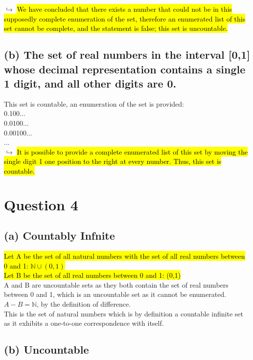 \documentclass[a4paper, 12pt]{article}
\begin{document}
$\hookrightarrow$ \hl{We have concluded that there exists a number that could not be in this supposedly complete enumeration of the set, therefore an enumerated list of this set cannot be complete, and the statement is false; this set is uncountable.}

\subsection*{(b) The set of real numbers in the interval [0,1] whose decimal representation contains a single 1 digit, and all other digits are 0.}

This set is countable, an enumeration of the set is provided:\\

0.100...\\
0.0100...\\
0.00100...\\
...\\

$\hookrightarrow$ \hl{It is possible to provide a complete enumerated list of this set by moving the single digit 1 one position to the right at every number. Thus, this set is countable.}

\pagebreak

\section*{Question 4}

\subsection*{(a) Countably Infnite}

\hl{Let A be the set of all natural numbers with the set of all real numbers between 0 and 1: $\mathbb{N}\cup (0,1)$}\\
\hl{Let B be the set of all real numbers between 0 and 1: (0,1)}\\

A and B are uncountable sets as they both contain the set of real numbers between 0 and 1, which is an uncountable set as it cannot be enumerated.\\

$A - B = \mathbb{N}$, by the definition of difference.\\
This is the set of natural numbers which is by definition a countable infinite set as it exhibits a one-to-one correspondence with itself.

\subsection*{(b) Uncountable}
\end{document}
